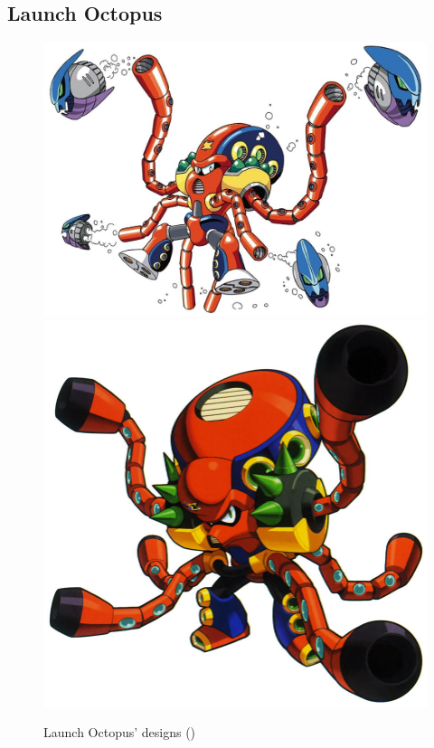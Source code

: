 \subsection{Launch Octopus}\label{boss:Launch_octopus}
\begin{figure}[htp]
	\centering
	\includegraphics[height=\portraitsize]{figures/X1/Launch_octopus/LaunchOctopus.jpg}
	\includegraphics[height=\portraitsize]{figures/X1/Launch_octopus/MHXLaunchOctopus.jpg}
	\caption{Launch Octopus' designs (\cite{book:MMX_Complete_art})}
\end{figure}
